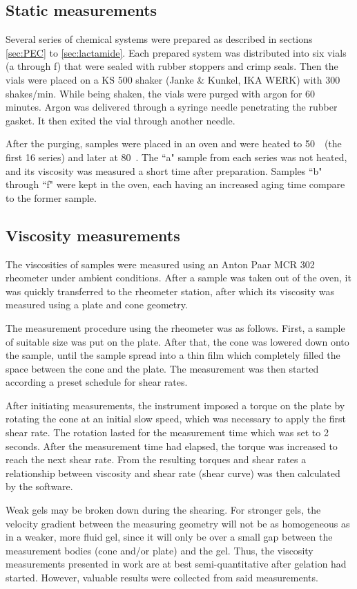 \documentclass[nanomaterials,article,submit,moreauthors,pdftex]{Definitions/mdpi}
\begin{document}
\subsection{Static measurements}
Several series of chemical systems were prepared as described in sections \ref{sec:PEC} to \ref{sec:lactamide}.
Each prepared system was distributed into six vials (a through f) that were sealed with rubber stoppers and crimp seals. Then the vials were placed on a KS 500 shaker (Janke \& Kunkel, IKA WERK) with 300 shakes/min. While being shaken, the vials were purged with argon for 60 minutes. Argon was delivered through a syringe needle penetrating the rubber gasket. It then exited the vial through another needle.

After the purging, samples were placed in an oven and were heated to 50~\celsius~(the first 16 series) and later at 80~\celsius. The ``a" sample from each series was not heated, and its viscosity was measured a short time after preparation. Samples ``b" through ``f" were kept in the oven, each having an increased aging time compare to the former sample. 

\subsection{Viscosity measurements}
The viscosities of samples were measured using an Anton Paar MCR 302 rheometer under ambient conditions. After a sample was taken out of the oven, it was quickly transferred to the rheometer station, after which its viscosity was measured using a plate and cone geometry.

The measurement procedure using the rheometer was as follows. First, a sample of suitable size was put on the plate. After that, the cone was lowered down onto the sample, until the sample spread into a thin film which completely filled the space between the cone and the plate. The measurement was then started according a preset schedule for shear rates. 

After initiating measurements, the instrument imposed a torque on the plate by rotating the cone at an initial slow speed, which was necessary to apply the first shear rate. The rotation lasted for the measurement time which was set to 2 seconds. After the measurement time had elapsed, the torque was increased to reach the next shear rate. From the resulting torques and shear rates a relationship between viscosity and shear rate (shear curve) was then calculated by the software.

Weak gels may be broken down during the shearing. For stronger gels, the velocity gradient between the measuring geometry will not be as homogeneous as in a weaker, more fluid gel, since it will only be over a small gap between the measurement bodies (cone and/or plate) and the gel. Thus, the viscosity measurements presented in work are at best semi-quantitative after gelation had started. However, valuable results were collected from said measurements.
\end{document}
